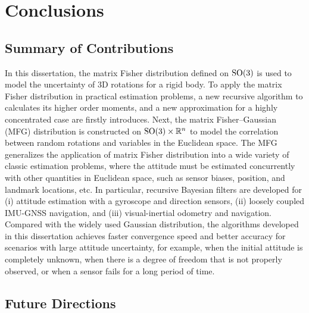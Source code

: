 
\chapter{Conclusions} \label{chap:conclusion}

\section{Summary of Contributions}

In this dissertation, the matrix Fisher distribution defined on $\mathrm{SO}(3)$ is used to model the uncertainty of 3D rotations for a rigid body.
To apply the matrix Fisher distribution in practical estimation problems, a new recursive algorithm to calculates its higher order moments, and a new approximation for a highly concentrated case are firstly introduces.
Next, the matrix Fisher--Gaussian (MFG) distribution is constructed on $\mathrm{SO}(3)\times \mathbb{R}^n$ to model the correlation between random rotations and variables in the Euclidean space.
The MFG generalizes the application of matrix Fisher distribution into a wide variety of classic estimation problems, where the attitude must be estimated concurrently with other quantities in Euclidean space, such as sensor biases, position, and landmark locations, etc.
In particular, recursive Bayesian filters are developed for (i) attitude estimation with a gyroscope and direction sensors, (ii) loosely coupled IMU-GNSS navigation, and (iii) visual-inertial odometry and navigation.
Compared with the widely used Gaussian distribution, the algorithms developed in this dissertation achieves faster convergence speed and better accuracy for scenarios with large attitude uncertainty, for example, when the initial attitude is completely unknown, when there is a degree of freedom that is not properly observed, or when a sensor fails for a long period of time.

\section{Future Directions}

